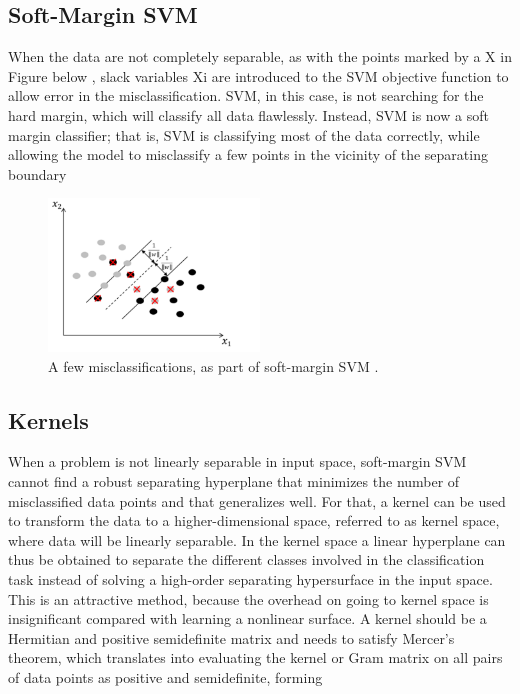 \subsection{Soft-Margin SVM}

When the data are not completely separable, as with the points marked by a X in Figure below  , slack variables Xi  are introduced to the SVM objective function to allow error in the misclassification. SVM, in this case, is not searching for the hard margin, which will classify all data flawlessly. Instead, SVM is now a soft margin classifier; that is, SVM is classifying most of the data correctly, while allowing the model to misclassify a few points in the vicinity of the separating boundary

\begin{figure}[H]
\centering
\includegraphics[width=0.5\textwidth]{img/softmargin.PNG}
\caption{  A few misclassifications, as part of soft-margin SVM . }
\label{126 }
\end{figure}


\subsection{Kernels}

When a problem is not linearly separable in input space, soft-margin SVM cannot find a robust separating
hyperplane that minimizes the number of misclassified data points and that generalizes well. For that, a kernel can be used to transform the data to a higher-dimensional space, referred to as kernel space, where data will be linearly separable. In the kernel space a linear hyperplane can thus be obtained to separate the different classes involved in the classification task instead of solving a high-order separating hypersurface in the input space. This is an attractive method, because the overhead on going to kernel space is insignificant compared with learning a nonlinear surface. A kernel should be a Hermitian and positive semidefinite matrix and needs to satisfy Mercer’s theorem, which translates into evaluating the kernel or Gram matrix on all pairs of data points as positive and semidefinite, forming

